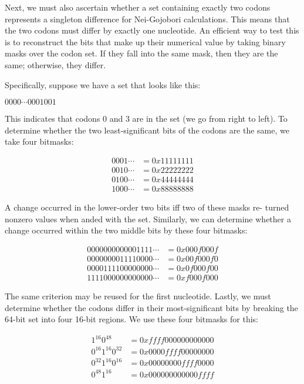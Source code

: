 \documentclass{article}
\begin{document}
      Next, we must also ascertain whether a set containing exactly two codons
      represents a singleton difference for Nei-Gojobori calculations. This
      means that the two codons must differ by exactly one nucleotide. An
      efficient way to test this is to reconstruct the bits that make up their
      numerical value by taking binary masks over the codon set. If they fall
      into the same mask, then they are the same; otherwise, they differ.

      Specifically, suppose we have a set that looks like this:

      \begin{center}
        $0000 \cdots 0001001$
      \end{center}

      \noindent This indicates that codons 0 and 3 are in the set (we go from
	  right to left). To determine whether the two least-significant bits
      of the codons are the same, we take four bitmasks:

      \begin{align*}
        0001 \cdots & = 0x11111111 \\ %
        0010 \cdots & = 0x22222222 \\ %
        0100 \cdots & = 0x44444444 \\ %
        1000 \cdots & = 0x88888888
      \end{align*}

      A change occurred in the lower-order two bits iff two of these masks re-
      turned nonzero values when anded with the set. Similarly, we can determine
      whether a change occurred within the two middle bits by these four
      bitmasks:

      \begin{align*}
        0000000000001111 \cdots & = 0x000f000f \\ %
        0000000011110000 \cdots & = 0x00f000f0 \\ %
        0000111100000000 \cdots & = 0x0f000f00 \\ %
        1111000000000000 \cdots & = 0xf000f000
      \end{align*}

      The same criterion may be reused for the first nucleotide. Lastly, we must
      determine whether the codons differ in their most-significant bits by
      breaking the 64-bit set into four 16-bit regions. We use these four
      bitmasks for this:

      \begin{align*}
	1^{16}0^{48} 		& = 0xffff000000000000 \\ %
	0^{16}1^{16}0^{32}	& = 0x0000ffff00000000 \\ %
	0^{32}1^{16}0^{16}	& = 0x00000000ffff0000 \\ %
	0^{48}1^{16}		& = 0x000000000000ffff
      \end{align*}
\end{document}
